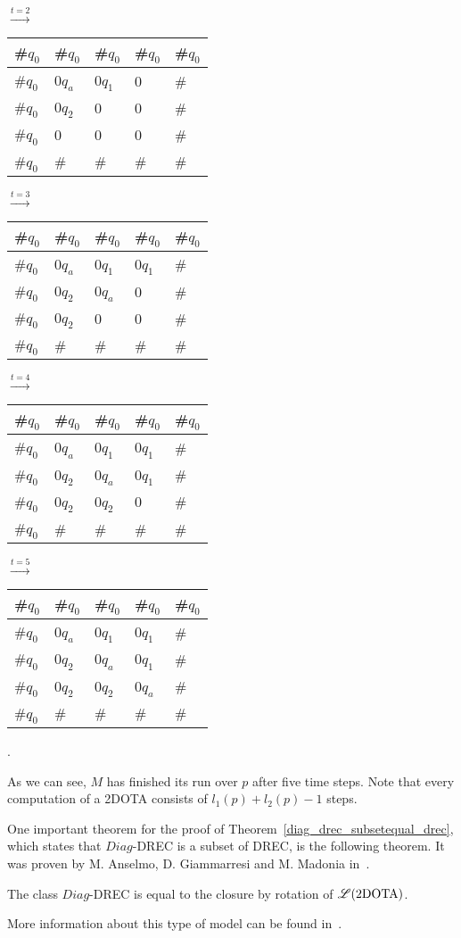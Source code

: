 \begin{center}
$\overset{t = 2}{\rightarrow}$
\begin{tabular}{|C{1.1cm}|C{1.1cm}|C{1.1cm}|C{1.1cm}|C{1.1cm}|}
\hline
\#$q_0$ & \#$q_0$ & \#$q_0$ & \#$q_0$ & \#$q_0$ \tabularnewline
\hline
\#$q_0$ & 0$q_a$  & 0$q_1$  & 0       & \#      \tabularnewline
\hline
\#$q_0$ & 0$q_2$  & 0       & 0       & \#      \tabularnewline
\hline
\#$q_0$ & 0       & 0       & 0       & \#      \tabularnewline
\hline
\#$q_0$ & \#      & \#      & \#      & \#      \tabularnewline
\hline
\end{tabular}
$\overset{t = 3}{\rightarrow}$
\begin{tabular}{|C{1.1cm}|C{1.1cm}|C{1.1cm}|C{1.1cm}|C{1.1cm}|}
\hline
\#$q_0$ & \#$q_0$ & \#$q_0$ & \#$q_0$ & \#$q_0$ \tabularnewline
\hline
\#$q_0$ & 0$q_a$  & 0$q_1$  & 0$q_1$  & \#      \tabularnewline
\hline
\#$q_0$ & 0$q_2$  & 0$q_a$  & 0       & \#      \tabularnewline
\hline
\#$q_0$ & 0$q_2$  & 0       & 0       & \#      \tabularnewline
\hline
\#$q_0$ & \#      & \#      & \#      & \#      \tabularnewline
\hline
\end{tabular}
\end{center}
\begin{center}
$\overset{t = 4}{\rightarrow}$
\begin{tabular}{|C{1.1cm}|C{1.1cm}|C{1.1cm}|C{1.1cm}|C{1.1cm}|}
\hline
\#$q_0$ & \#$q_0$ & \#$q_0$ & \#$q_0$ & \#$q_0$ \tabularnewline
\hline
\#$q_0$ & 0$q_a$  & 0$q_1$  & 0$q_1$  & \#      \tabularnewline
\hline
\#$q_0$ & 0$q_2$  & 0$q_a$  & 0$q_1$  & \#      \tabularnewline
\hline
\#$q_0$ & 0$q_2$  & 0$q_2$  & 0       & \#      \tabularnewline
\hline
\#$q_0$ & \#      & \#      & \#      & \#      \tabularnewline
\hline
\end{tabular}
$\overset{t = 5}{\rightarrow}$
\begin{tabular}{|C{1.1cm}|C{1.1cm}|C{1.1cm}|C{1.1cm}|C{1.1cm}|}
\hline
\#$q_0$ & \#$q_0$ & \#$q_0$ & \#$q_0$ & \#$q_0$ \tabularnewline
\hline
\#$q_0$ & 0$q_a$  & 0$q_1$  & 0$q_1$  & \#      \tabularnewline
\hline
\#$q_0$ & 0$q_2$  & 0$q_a$  & 0$q_1$  & \#      \tabularnewline
\hline
\#$q_0$ & 0$q_2$  & 0$q_2$  & 0$q_a$  & \#      \tabularnewline
\hline
\#$q_0$ & \#      & \#      & \#      & \#      \tabularnewline
\hline
\end{tabular}.
\end{center}
As we can see, $M$ has finished its run over $p$ after five time steps. Note that every
computation of a 2DOTA consists of $l_1(p) + l_2(p) - 1$ steps.

One important theorem for the proof of Theorem~\ref{diag_drec_subsetequal_drec}, which states that
$Diag$-DREC is a subset of DREC, is the following theorem. It was proven by M. Anselmo, D.
Giammarresi and M. Madonia in~\cite{anselmo2007determinism}.
\begin{theorem}
The class $Diag$-DREC is equal to the closure by rotation of $\mathscr{L}(\text{2DOTA})$. 
\label{diag_drec_equal_closure_rotation_2dota}
\end{theorem}
More information about this type of model can be found in~\cite{giammarresi1997twodimensional}.
\label{ota}